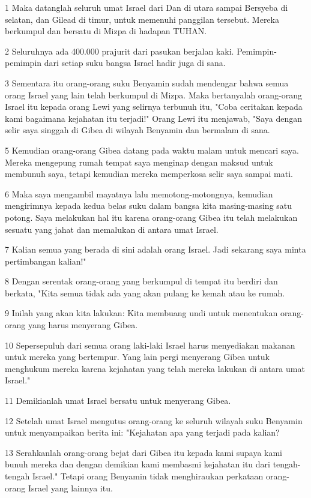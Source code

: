 \par 1 Maka datanglah seluruh umat Israel dari Dan di utara sampai Bersyeba di selatan, dan Gilead di timur, untuk memenuhi panggilan tersebut. Mereka berkumpul dan bersatu di Mizpa di hadapan TUHAN.
\par 2 Seluruhnya ada 400.000 prajurit dari pasukan berjalan kaki. Pemimpin-pemimpin dari setiap suku bangsa Israel hadir juga di sana.
\par 3 Sementara itu orang-orang suku Benyamin sudah mendengar bahwa semua orang Israel yang lain telah berkumpul di Mizpa. Maka bertanyalah orang-orang Israel itu kepada orang Lewi yang selirnya terbunuh itu, "Coba ceritakan kepada kami bagaimana kejahatan itu terjadi!" Orang Lewi itu menjawab, "Saya dengan selir saya singgah di Gibea di wilayah Benyamin dan bermalam di sana.
\par 5 Kemudian orang-orang Gibea datang pada waktu malam untuk mencari saya. Mereka mengepung rumah tempat saya menginap dengan maksud untuk membunuh saya, tetapi kemudian mereka memperkosa selir saya sampai mati.
\par 6 Maka saya mengambil mayatnya lalu memotong-motongnya, kemudian mengirimnya kepada kedua belas suku dalam bangsa kita masing-masing satu potong. Saya melakukan hal itu karena orang-orang Gibea itu telah melakukan sesuatu yang jahat dan memalukan di antara umat Israel.
\par 7 Kalian semua yang berada di sini adalah orang Israel. Jadi sekarang saya minta pertimbangan kalian!"
\par 8 Dengan serentak orang-orang yang berkumpul di tempat itu berdiri dan berkata, "Kita semua tidak ada yang akan pulang ke kemah atau ke rumah.
\par 9 Inilah yang akan kita lakukan: Kita membuang undi untuk menentukan orang-orang yang harus menyerang Gibea.
\par 10 Sepersepuluh dari semua orang laki-laki Israel harus menyediakan makanan untuk mereka yang bertempur. Yang lain pergi menyerang Gibea untuk menghukum mereka karena kejahatan yang telah mereka lakukan di antara umat Israel."
\par 11 Demikianlah umat Israel bersatu untuk menyerang Gibea.
\par 12 Setelah umat Israel mengutus orang-orang ke seluruh wilayah suku Benyamin untuk menyampaikan berita ini: "Kejahatan apa yang terjadi pada kalian?
\par 13 Serahkanlah orang-orang bejat dari Gibea itu kepada kami supaya kami bunuh mereka dan dengan demikian kami membasmi kejahatan itu dari tengah-tengah Israel." Tetapi orang Benyamin tidak menghiraukan perkataan orang-orang Israel yang lainnya itu.
